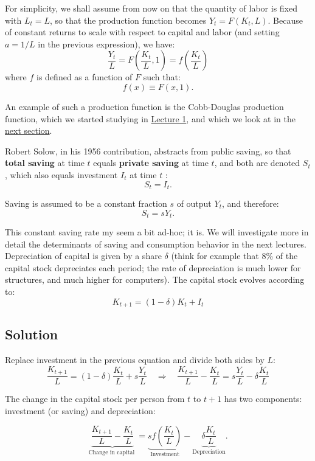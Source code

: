 \documentclass[]{book}
\theoremstyle{definition}
\theoremstyle{definition}
\theoremstyle{definition}
\theoremstyle{remark}
\begin{document}
For simplicity, we shall assume from now on that the quantity of labor
is fixed with \(L_t=L\), so that the production function becomes
\(Y_t=F(K_t, L)\). Because of constant returns to scale with respect to
capital and labor (and setting \(a=1/L\) in the previous expression), we
have:
\[\frac{Y_t}{L}=F\left(\frac{K_t}{L},1\right)=f\left(\frac{K_t}{L}\right)\]
where \(f\) is defined as a function of \(F\) such that:
\[f(x)\equiv F(x,1).\]

An example of such a production function is the Cobb-Douglas production
function, which we started studying in \href{lecture1.html}{Lecture 1},
and which we look at in the \protect\hyperlink{cobb}{next section}.

Robert Solow, in his 1956 contribution, abstracts from public saving, so
that \textbf{total saving} at time \(t\) equals \textbf{private saving}
at time \(t\), and both are denoted \(S_{t}\), which also equals
investment \(I_{t}\) at time \(t\) : \[S_{t}=I_{t}.\]

Saving is assumed to be a constant fraction \(s\) of output \(Y_{t}\),
and therefore: \[S_{t}=sY_{t}.\]

This constant saving rate my seem a bit ad-hoc; it is. We will
investigate more in detail the determinants of saving and consumption
behavior in the next lectures. Depreciation of capital is given by a
share \(\delta\) (think for example that 8\% of the capital stock
depreciates each period; the rate of depreciation is much lower for
structures, and much higher for computers). The capital stock evolves
according to: \[K_{t+1}=\left(1-\delta\right)K_{t}+I_{t}\]

\subsection{Solution}\label{solution}

Replace investment in the previous equation and divide both sides by
\(L\):
\[\frac{K_{t+1}}{L} =\left(1-\delta\right)\frac{K_{t}}{L}+s\frac{Y_{t}}{L}\quad\Rightarrow\quad\boxed{\frac{K_{t+1}}{L}-\frac{K_{t}}{L}=s\frac{Y_{t}}{L}-\delta\frac{K_{t}}{L}}\]

The change in the capital stock per person from \(t\) to \(t+1\) has two
components: investment (or saving) and depreciation:

\[\underbrace{\frac{K_{t+1}}{L}-\frac{K_{t}}{L}}_{\text{Change in capital }}=\underbrace{sf\left(\frac{K_{t}}{L}\right)}_{\text{Investment}}-\underbrace{\delta\frac{K_{t}}{L}}_{\text{Depreciation}}.\]
\end{document}
